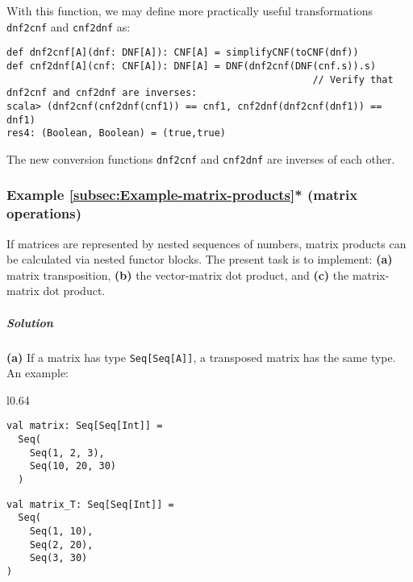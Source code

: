 With this function, we may define more practically useful transformations
\lstinline!dnf2cnf! and \lstinline!cnf2dnf! as:
\begin{lstlisting}
def dnf2cnf[A](dnf: DNF[A]): CNF[A] = simplifyCNF(toCNF(dnf))
def cnf2dnf[A](cnf: CNF[A]): DNF[A] = DNF(dnf2cnf(DNF(cnf.s)).s)
                                                     // Verify that dnf2cnf and cnf2dnf are inverses:
scala> (dnf2cnf(cnf2dnf(cnf1)) == cnf1, cnf2dnf(dnf2cnf(dnf1)) == dnf1)
res4: (Boolean, Boolean) = (true,true)
\end{lstlisting}
The new conversion functions \lstinline!dnf2cnf! and \lstinline!cnf2dnf!
are inverses of each other.

\subsubsection{Example \label{subsec:Example-matrix-products}\ref{subsec:Example-matrix-products}{*}
(matrix operations)}

If matrices are represented by nested sequences of numbers, matrix
products can be calculated via nested functor blocks. The present
task is to implement: \textbf{(a)} matrix transposition, \textbf{(b)}
the vector-matrix dot product, and \textbf{(c)} the matrix-matrix
dot product.

\subparagraph{Solution}

\textbf{(a)} If a matrix has type \lstinline!Seq[Seq[A]]!, a transposed
matrix has the same type. An example:

\begin{wrapfigure}{l}{0.64\columnwidth}%
\vspace{-0.85\baselineskip}
\begin{minipage}[t]{0.45\linewidth}%
\begin{lstlisting}
val matrix: Seq[Seq[Int]] =
  Seq(
    Seq(1, 2, 3),
    Seq(10, 20, 30)
  )
\end{lstlisting}
%
\end{minipage}\hfill{}%
\begin{minipage}[t]{0.48\linewidth}%
\begin{lstlisting}
val matrix_T: Seq[Seq[Int]] =
  Seq(
    Seq(1, 10),
    Seq(2, 20),
    Seq(3, 30)
)
\end{lstlisting}
%
\end{minipage} ~ \vspace{-0.95\baselineskip}
\end{wrapfigure}%

